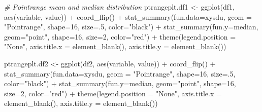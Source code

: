 \documentclass[
]{article}
\newenvironment{Shaded}{\begin{snugshade}}{\end{snugshade}}
\newcommand{\AttributeTok}[1]{\textcolor[rgb]{0.77,0.63,0.00}{#1}}
\newcommand{\CommentTok}[1]{\textcolor[rgb]{0.56,0.35,0.01}{\textit{#1}}}
\newcommand{\DecValTok}[1]{\textcolor[rgb]{0.00,0.00,0.81}{#1}}
\newcommand{\FunctionTok}[1]{\textcolor[rgb]{0.00,0.00,0.00}{#1}}
\newcommand{\NormalTok}[1]{#1}
\newcommand{\OtherTok}[1]{\textcolor[rgb]{0.56,0.35,0.01}{#1}}
\newcommand{\SpecialCharTok}[1]{\textcolor[rgb]{0.00,0.00,0.00}{#1}}
\newcommand{\StringTok}[1]{\textcolor[rgb]{0.31,0.60,0.02}{#1}}
\begin{document}
\begin{Shaded}
\begin{Highlighting}[]
\CommentTok{\# Pointrange mean and median distribution}
\NormalTok{ptrangeplt.df1 }\OtherTok{\textless{}{-}} \FunctionTok{ggplot}\NormalTok{(df1, }\FunctionTok{aes}\NormalTok{(variable, value)) }\SpecialCharTok{+} \FunctionTok{coord\_flip}\NormalTok{() }\SpecialCharTok{+} 
  \FunctionTok{stat\_summary}\NormalTok{(}\AttributeTok{fun.data=}\NormalTok{xysdu, }\AttributeTok{geom =} \StringTok{"Pointrange"}\NormalTok{, }\AttributeTok{shape=}\DecValTok{16}\NormalTok{, }\AttributeTok{size=}\NormalTok{.}\DecValTok{5}\NormalTok{, }\AttributeTok{color=}\StringTok{"black"}\NormalTok{) }\SpecialCharTok{+}
  \FunctionTok{stat\_summary}\NormalTok{(}\AttributeTok{fun.y=}\NormalTok{median, }\AttributeTok{geom=}\StringTok{"point"}\NormalTok{, }\AttributeTok{shape=}\DecValTok{16}\NormalTok{, }\AttributeTok{size=}\DecValTok{2}\NormalTok{, }\AttributeTok{color=}\StringTok{"red"}\NormalTok{) }\SpecialCharTok{+} 
  \FunctionTok{theme}\NormalTok{(}\AttributeTok{legend.position =} \StringTok{"None"}\NormalTok{, }\AttributeTok{axis.title.x =} \FunctionTok{element\_blank}\NormalTok{(), }\AttributeTok{axis.title.y =} \FunctionTok{element\_blank}\NormalTok{())}

\NormalTok{ptrangeplt.df2 }\OtherTok{\textless{}{-}} \FunctionTok{ggplot}\NormalTok{(df2, }\FunctionTok{aes}\NormalTok{(variable, value)) }\SpecialCharTok{+} \FunctionTok{coord\_flip}\NormalTok{() }\SpecialCharTok{+} 
  \FunctionTok{stat\_summary}\NormalTok{(}\AttributeTok{fun.data=}\NormalTok{xysdu, }\AttributeTok{geom =} \StringTok{"Pointrange"}\NormalTok{, }\AttributeTok{shape=}\DecValTok{16}\NormalTok{, }\AttributeTok{size=}\NormalTok{.}\DecValTok{5}\NormalTok{, }\AttributeTok{color=}\StringTok{"black"}\NormalTok{) }\SpecialCharTok{+}
  \FunctionTok{stat\_summary}\NormalTok{(}\AttributeTok{fun.y=}\NormalTok{median, }\AttributeTok{geom=}\StringTok{"point"}\NormalTok{, }\AttributeTok{shape=}\DecValTok{16}\NormalTok{, }\AttributeTok{size=}\DecValTok{2}\NormalTok{, }\AttributeTok{color=}\StringTok{"red"}\NormalTok{) }\SpecialCharTok{+} 
  \FunctionTok{theme}\NormalTok{(}\AttributeTok{legend.position =} \StringTok{"None"}\NormalTok{, }\AttributeTok{axis.title.x =} \FunctionTok{element\_blank}\NormalTok{(), }\AttributeTok{axis.title.y =} \FunctionTok{element\_blank}\NormalTok{())}


\end{Highlighting}
\end{Shaded}
\end{document}

